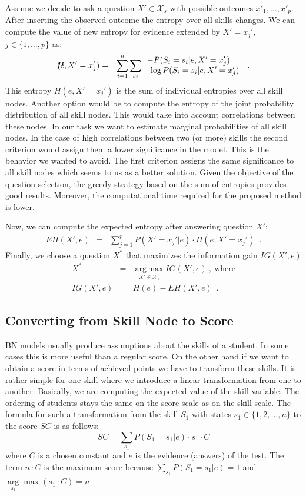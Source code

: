 Assume we decide to ask a question $X' \in \mathcal{X}_s$ with possible outcomes $x'_1,\ldots,x'_p$. 
After inserting the observed outcome the entropy over all skills changes. 
We can compute the value of new entropy for evidence extended by $X' = x_j'$, $j \in \{1,\ldots,p\}$ as:
\begin{eqnarray*}
\lefteqn H(e,X'=x_j') & = & \sum_{i =1}^n \sum_{s_i} \begin{array}{ll}
-P(S_i=s_i|e,X'=x_j')\\
\cdot \log P(S_i=s_i|e,X'=x_j') 
\end{array}\enspace .
\end{eqnarray*}
This entropy $H(e,X'=x_j')$ is the sum of individual entropies over all skill nodes. Another option would be to compute the entropy of the joint probability distribution of all skill nodes. This would take into account correlations between these nodes. In our task we want to estimate marginal probabilities of all skill nodes. In the case of high correlations between two (or more) skills the second criterion would assign them a lower significance in the model. This is the behavior we wanted to avoid. The first criterion assigns the same significance to all skill nodes which seems to us as a better solution. Given the objective of the question selection, the greedy strategy based on the sum of entropies provides good results. Moreover, the computational time required for the proposed method is lower.

Now, we can compute the expected entropy after answering question $X'$: 
\begin{eqnarray*}
EH(X',e) & = & \sum_{j=1}^p P(X'=x_j'|e) \cdot H(e,X'=x_j') \enspace .
\end{eqnarray*}
Finally, we choose a question $X^*$ that maximizes the information gain $IG(X',e)$
\begin{eqnarray*}
X^* & = & \operatorname*{arg\,max}_{X' \in \mathcal{X}_s} IG(X',e) \ , \ \mbox{where}\\
IG(X',e) & = & H(e)  - EH(X',e) \enspace .
\end{eqnarray*}


\subsection{Converting from Skill Node to Score}
\label{sec:converting_skill}
BN models usually produce assumptions about the skills of a student. In some cases this is more useful than a regular score. On the other hand if we want to obtain a score in terms of achieved points we have to transform these skills. It is rather simple for one skill where we introduce a linear transformation from one to another. Basically, we are computing the expected value of the skill variable. The ordering of students stays the same on the score scale as on the skill scale. The formula for such a transformation from the skill $S_1$ with states $s_1 \in \{1,2,\ldots,n\}$ to the score $SC$ is as follows:
$$SC = \sum_{s_1}{P(S_1=s_1|e)\cdot s_1\cdot C} $$
where $C$ is a chosen constant and $e$ is the evidence (answers) of the test. The term $n\cdot C$ is the maximum score because $\sum_{s_1}{P(S_1=s_1|e)} = 1$ and $\underset{s_1}\arg \max (s_1\cdot C) = n$

